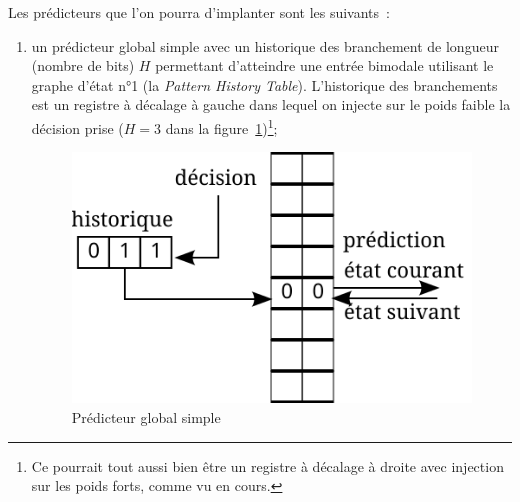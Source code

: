 \documentclass[a4paper]{article}
\begin{document}
Les prédicteurs que l'on pourra d'implanter sont les suivants~:
\begin{enumerate}
\item un prédicteur global simple avec un historique des branchement de longueur (nombre de bits) $H$ permettant d'atteindre une entrée bimodale utilisant le graphe d'état n°1 (la \emph{Pattern History Table}).
   L'historique des branchements est un registre à décalage à gauche dans lequel on injecte sur le poids faible la décision prise ($H=3$ dans la figure~\ref{global-simple})\footnote{Ce pourrait tout aussi bien être un registre à décalage à droite avec injection sur les poids forts, comme vu en cours.};
      \begin{figure}[hbt]\center\leavevmode
      \includegraphics[scale=.9]{global-simple}
      \caption{Prédicteur global simple}
      \label{global-simple}
      \end{figure}



\end{enumerate}
\end{document}
